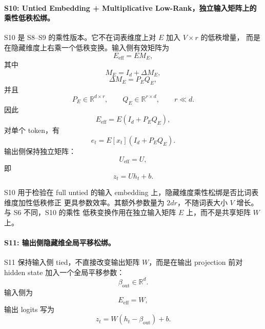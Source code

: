 \paragraph{S10: Untied Embedding + Multiplicative Low-Rank，独立输入矩阵上的乘性低秩松绑。}
S10 是 S8--S9 的乘性版本。它不在词表维度上对 $E$ 加入 $V \times r$ 的低秩增量，
而是在隐藏维度上右乘一个低秩变换。输入侧有效矩阵为
\begin{equation}
    E_{\mathrm{eff}} = E M_E,
\end{equation}
其中
\begin{equation}
    M_E = I_d + \Delta M_E,
\end{equation}
\begin{equation}
    \Delta M_E = P_E Q_E,
\end{equation}
并且
\begin{equation}
    P_E \in \mathbb{R}^{d \times r}, \qquad
    Q_E \in \mathbb{R}^{r \times d}, \qquad
    r \ll d.
\end{equation}
因此
\begin{equation}
    E_{\mathrm{eff}} = E(I_d+P_EQ_E),
\end{equation}
对单个 token，有
\begin{equation}
    e_t = E[x_t](I_d+P_EQ_E).
\end{equation}
输出侧保持独立矩阵：
\begin{equation}
    U_{\mathrm{eff}} = U,
\end{equation}
即
\begin{equation}
    z_t = U h_t + b.
\end{equation}

S10 用于检验在 full untied 的输入 embedding 上，隐藏维度乘性松绑是否比词表维度加性低秩修正
更具参数效率。其额外参数量为 $2dr$，不随词表大小 $V$ 增长。与 S6 不同，S10 的乘性
低秩变换作用在独立输入矩阵 $E$ 上，而不是共享矩阵 $W$ 上。

\paragraph{S11: 输出侧隐藏维全局平移松绑。}
S11 保持输入侧 tied，不直接改变输出矩阵 $W$，而是在输出 projection 前对 hidden state
加入一个全局平移参数：
\begin{equation}
    \beta_{\mathrm{out}} \in \mathbb{R}^{d}.
\end{equation}
输入侧为
\begin{equation}
    E_{\mathrm{eff}} = W,
\end{equation}
输出 logits 写为
\begin{equation}
    z_t = W(h_t-\beta_{\mathrm{out}})+b.
\end{equation}

